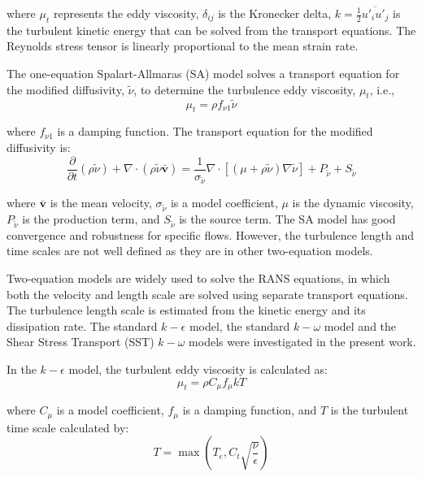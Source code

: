 \documentclass[onecolumn,11pt]{report}
\begin{document}
where $\mu_t$ represents the eddy viscosity, $\delta_{ij}$ is the Kronecker delta, $k=\frac{1}{2}\overline{u'_i u'_j}$ is the turbulent kinetic energy that can be solved from the transport equations. The Reynolds stress tensor is linearly proportional to the mean strain rate.  

The one-equation Spalart-Allmaras (SA) model solves a transport equation for the modified diffusivity, $\tilde{\nu}$, to determine the turbulence eddy viscosity, $\mu_t$, i.e.,
\begin{equation}
\mu_t=\rho f_{\nu 1} \tilde{\nu}
\label{eq4}
\end{equation}

where $f_{\nu 1}$ is a damping function. The transport equation for the modified diffusivity is:
\begin{equation}
\frac{\partial}{\partial t} (\rho \tilde{\nu}) + \nabla \cdot \left (\rho \tilde{\nu} \bar{\textbf{v}} \right ) = \frac{1}{\sigma_{\tilde{\nu}}} \nabla \cdot \left [ (\mu + \rho \tilde{\nu}) \nabla \tilde{\nu} \right ] + P_{\tilde{\nu}} + S_{\tilde{\nu}}
\label{eq5}
\end{equation}

where $\bar{\textbf{v}}$ is the mean velocity, $\sigma_{\tilde{\nu}}$ is a model coefficient, $\mu$ is the dynamic viscosity, $P_{\tilde{\nu}}$ is the production term, and $S_{\tilde{\nu}}$ is the source term. The SA model has good convergence and robustness for specific flows. However, the turbulence length and time scales are not well defined as they are in other two-equation models.

Two-equation models are widely used to solve the RANS equations, in which both the velocity and length scale are solved using separate transport equations. The turbulence length scale is estimated from the kinetic energy and its dissipation rate. The standard $k-\epsilon$ model,  the standard $k-\omega$ model and the Shear Stress Transport (SST) $k-\omega$ models were investigated in the present work. 

In the $k-\epsilon$ model, the turbulent eddy viscosity is calculated as:
\begin{equation}
\mu_t=\rho C_{\mu}f_{\mu} kT
\label{eq6}
\end{equation}

where $C_{\mu}$ is a model coefficient, $f_{\mu}$ is a damping function,  and $T$ is the turbulent time scale calculated by:
\begin{equation}
T = \max(T_e,C_t\sqrt{\frac{\nu}{\epsilon}})
\label{eq7}
\end{equation}
\end{document}

